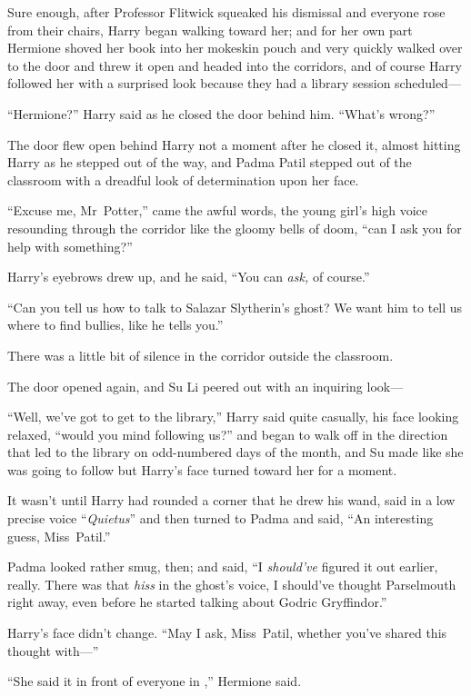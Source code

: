 Sure enough, after Professor Flitwick squeaked his dismissal and everyone rose from their chairs, Harry began walking toward her; and for her own part Hermione shoved her book into her mokeskin pouch and very quickly walked over to the door and threw it open and headed into the corridors, and of course Harry followed her with a surprised look because they had a library session scheduled—

“Hermione?” Harry said as he closed the door behind him. “What’s wrong?”

The door flew open behind Harry not a moment after he closed it, almost hitting Harry as he stepped out of the way, and Padma Patil stepped out of the classroom with a dreadful look of determination upon her face.

“Excuse me, Mr~Potter,” came the awful words, the young girl’s high voice resounding through the corridor like the gloomy bells of doom, “can I ask you for help with something?”

Harry’s eyebrows drew up, and he said, “You can \emph{ask,} of course.”

“Can you tell us how to talk to Salazar Slytherin’s ghost? We want him to tell us where to find bullies, like he tells you.”

There was a little bit of silence in the corridor outside the classroom.

The door opened again, and Su Li peered out with an inquiring look—

“Well, we’ve got to get to the library,” Harry said quite casually, his face looking relaxed, “would you mind following us?” and began to walk off in the direction that led to the library on odd-numbered days of the month, and Su made like she was going to follow but Harry’s face turned toward her for a moment.

It wasn’t until Harry had rounded a corner that he drew his wand, said in a low precise voice “\emph{Quietus}” and then turned to Padma and said, “An interesting guess, Miss~Patil.”

Padma looked rather smug, then; and said, “I \emph{should’ve} figured it out earlier, really. There was that \emph{hiss} in the ghost’s voice, I should’ve thought Parselmouth right away, even before he started talking about Godric Gryffindor.”

Harry’s face didn’t change. “May I ask, Miss~Patil, whether you’ve shared this thought with—”

“She said it in front of everyone in \SPHEW,” Hermione said.

